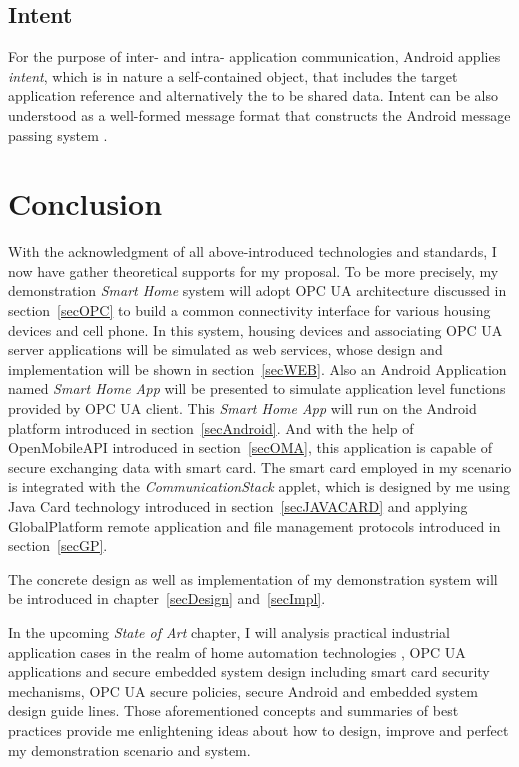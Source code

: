 \subsection{Intent} \label{secIntent}
For the purpose of inter- and intra- application communication, Android applies \emph{intent}, which is in nature a self-contained object, that includes the target application reference and alternatively the to be shared data.  Intent can be also understood as a well-formed message format that constructs the Android message passing system \cite{android_secure_inter}.

\section{Conclusion}
With the acknowledgment of all above-introduced technologies and standards, I now have gather theoretical   supports for my proposal. To be more precisely, my demonstration \emph{Smart Home} system will adopt OPC UA architecture discussed in section~\ref{secOPC} to build a common connectivity interface for various housing devices and cell phone.  In this system, housing devices and associating OPC UA server applications will be simulated as web services, whose design and implementation will be shown in section~\ref{secWEB}. Also an Android Application named \emph{Smart Home App} will be presented to simulate application level functions provided by OPC UA client. This \emph{Smart Home App} will run on the Android platform introduced in section~\ref{secAndroid}. And with the help of OpenMobileAPI introduced in section~\ref{secOMA}, this application is capable of secure exchanging data with smart card. The smart card employed in my scenario is integrated with the \emph{CommunicationStack} applet, which is designed by me using Java Card technology introduced in section~\ref{secJAVACARD} and applying GlobalPlatform remote application and file management protocols introduced in section~\ref{secGP}.

The concrete design as well as implementation of my demonstration system will be introduced in chapter~\ref{secDesign} and~\ref{secImpl}.

In the upcoming \emph{State of Art} chapter, I will analysis practical industrial application cases in the realm of home automation technologies , OPC UA applications and secure embedded system design including smart card security mechanisms, OPC UA secure policies, secure Android and embedded system design guide lines. Those aforementioned concepts and summaries of best practices provide me enlightening ideas about how to design, improve and perfect my demonstration scenario and system.